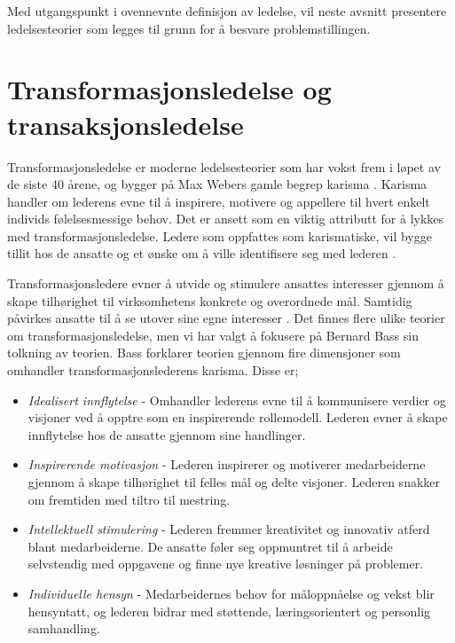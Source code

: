 \indent \newline
Med utgangspunkt i ovennevnte definisjon av ledelse, vil neste avsnitt presentere ledelsesteorier som legges til grunn for å besvare problemstillingen. 

\section{Transformasjonsledelse og transaksjonsledelse}
Transformasjonsledelse er moderne ledelsesteorier som har vokst frem i løpet av de siste 40 årene, og bygger på Max Webers gamle begrep karisma \cite[s.~137]{KommunikasjonForLedere}. Karisma handler om lederens evne til å inspirere, motivere og appellere til hvert enkelt individs følelsesmessige behov. Det er ansett som en viktig attributt for å lykkes med transformasjonsledelse. Ledere som oppfattes som karismatiske, vil bygge tillit hos de ansatte og et ønske om å ville identifisere seg med lederen \cite[s.~75]{PerspektiverLedelse}.

\indent \newline
Transformasjonsledere evner å utvide og stimulere ansattes interesser gjennom å skape tilhørighet til virksomhetens konkrete og overordnede mål. Samtidig påvirkes ansatte til å se utover sine egne interesser \cite[s.~75]{PerspektiverLedelse}. Det finnes flere ulike teorier om transformasjonsledelse, men vi har valgt å fokusere på Bernard Bass sin tolkning av teorien. Bass forklarer teorien gjennom fire dimensjoner som omhandler transformasjonslederens karisma. Disse er;

\begin{itemize}
\item\textit{Idealisert innflytelse} - Omhandler lederens evne til å kommunisere verdier og visjoner ved å opptre som en inspirerende rollemodell. Lederen evner å skape innflytelse hos de ansatte gjennom sine handlinger.
\item\textit{Inspirerende motivasjon} - Lederen inspirerer og motiverer medarbeiderne gjennom å skape tilhørighet til felles mål og delte visjoner. Lederen snakker om fremtiden med tiltro til mestring.
\item\textit{Intellektuell stimulering} - Lederen fremmer kreativitet og innovativ atferd blant medarbeiderne. De ansatte føler seg oppmuntret til å arbeide selvstendig med oppgavene og finne nye kreative løsninger på problemer.
\item\textit{Individuelle hensyn} - Medarbeidernes behov for måloppnåelse og vekst blir hensyntatt, og lederen bidrar med støttende, læringsorientert og personlig samhandling.
\end{itemize}
\cite{inspirerendeLeder}

